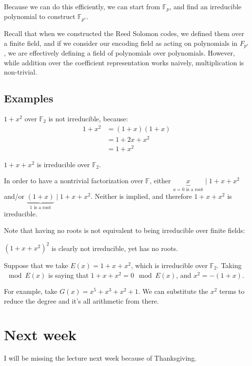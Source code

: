 \documentclass{idc_msc}
\newcommand{\Fq}[1][q]{{\mathbb{F}_{#1}}}
\begin{document}
Because we can do this efficiently, we can start from \(\Fq[p]\), and find an irreducible polynomial to construct \(\mathbb{F}_{p^s}\).

Recall that when we constructed the Reed Solomon codes, we defined them over a finite field, and if we consider our encoding field as acting on polynomials in \(F_{p^s}\), we are effectively defining a field of polynomials over polynomials. However, while addition over the coefficient representation works naively, multiplication is non-trivial.

\subsection{Examples}

\(1 + x^2\) over \(\mathbb{F}_2\) is not irreducible, because:
\[
\begin{aligned}
1 + x^2
& = (1 + x)(1 + x) \\
& = 1 + 2x + x^2 \\
& = 1 + x^2
\end{aligned}
\]

\(1 + x + x^2\) is irreducible over \(\mathbb{F}_2\).

In order to have a nontrivial factorization over \(\mathbb{F}\), either \(\underbrace{x}_{a = 0 \text{ is a root}} \mid 1 + x + x^2\) and/or \(\underbrace{(1+x)}_{1 \text{ is a root}} \mid 1 + x + x^2\).
Neither is implied, and therefore \(1 + x + x^2\) is irreducible.

Note that having no roots is not equivalent to being irreducible over finite fields:

\((1 + x + x^2)^2\) is clearly not irreducible, yet has no roots.

Suppose that we take \(E(x) = 1 + x + x^2\), which is irreducible over \(\mathbb{F}_2\).
Taking \(\mod E(x)\) is saying that \(1 + x + x^2 = 0 \mod E(x)\), and \(x^2 = -(1 + x)\).

For example, take \(G(x) = x^5 + x^3 + x^2 + 1\).
We can substitute the \(x^2\) terms to reduce the degree and it's all arithmetic from there.

\section{Next week}

I will be missing the lecture next week because of Thanksgiving.
\end{document}
